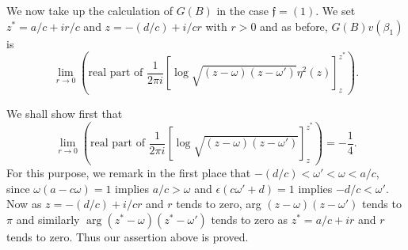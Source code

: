We now take up the calculation of $G(B)$ in the case
$\mathfrak{f}=(1)$. We set $z^{\ast}=a/c+ir/c$ and $z=-(d/c)+i/cr$
with $r>0$ and as before, $G(B)v(\beta_{1})$ is
$$
\lim\limits_{r\to 0}\left(\text{real part of } \frac{1}{2\pi
  i}\left[\log\sqrt{(z-\omega)(z-\omega')}\eta^{2}(z)\right]^{z^{\ast}}_{z}\right).  
$$

We shall show first that
$$
\lim\limits_{r\to 0}\left(\text{real part of } \frac{1}{2\pi
  i}\left[\log
  \sqrt{(z-\omega)(z-\omega')}\right]^{z^{\ast}}_{z}\right)=-\frac{1}{4}.
$$
For this purpose, we remark in the first place that
$-(d/c)<\omega'<\omega<a/c$, since $\omega(a-c\omega)=1$ implies
$a/c>\omega$ and $\epsilon(c\omega'+d)=1$ implies $-d/c<\omega'$. Now
as $z=-(d/c)+i/cr$ and $r$ tends to zero, arg $(z-\omega)(z-\omega')$
tends to $\pi$ and similarly $\arg(z^{\ast}-\omega)(z^{\ast}-\omega')$
tends to zero as $z^{\ast}=a/c+ir$ and $r$ tends to zero. Thus our
assertion above is proved.

